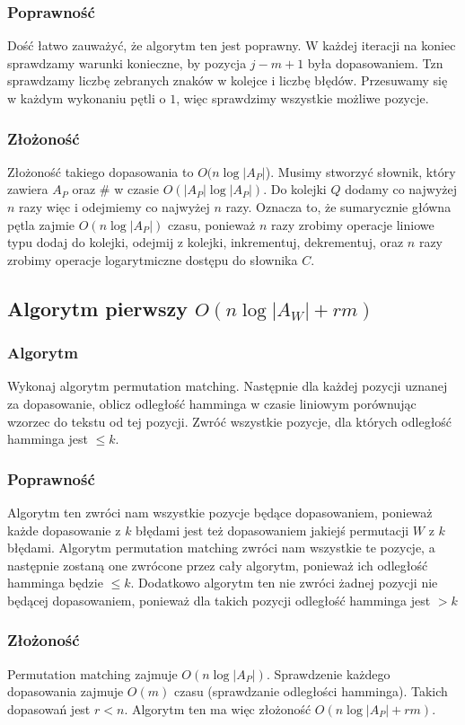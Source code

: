 \documentclass[a4paper,11pt]{article}
\begin{document}
\subsubsection*{Poprawność}
Dość łatwo zauważyć, że algorytm ten jest poprawny. W każdej iteracji na koniec sprawdzamy warunki konieczne, by pozycja $j-m+1$ była dopasowaniem. Tzn sprawdzamy liczbę zebranych znaków w kolejce i liczbę błędów. Przesuwamy się w każdym wykonaniu pętli o $1$, więc sprawdzimy wszystkie możliwe pozycje.
\subsubsection*{Złożoność}
Złożoność takiego dopasowania to $O(n\log |A_P|$). Musimy stworzyć słownik, który zawiera $A_P$ oraz $\#$ w czasie $O(|A_P|\log |A_P|)$. Do kolejki $Q$ dodamy co najwyżej $n$ razy więc i odejmiemy co najwyżej $n$ razy. Oznacza to, że sumarycznie główna pętla zajmie $O(n\log |A_P|)$ czasu, ponieważ $n$ razy zrobimy operacje liniowe typu dodaj do kolejki, odejmij z kolejki, inkrementuj, dekrementuj, oraz $n$ razy zrobimy operacje logarytmiczne dostępu do słownika $C$.

\subsection{Algorytm pierwszy $O(n\log|A_W|+rm)$}
\subsubsection*{Algorytm}
Wykonaj algorytm permutation matching. Następnie dla każdej pozycji uznanej za dopasowanie, oblicz odległość hamminga w czasie liniowym porównując wzorzec do tekstu od tej pozycji. Zwróć wszystkie pozycje, dla których odległość hamminga jest $\leq k$. \subsubsection*{Poprawność}
Algorytm ten zwróci nam wszystkie pozycje będące dopasowaniem, ponieważ każde dopasowanie z $k$ błędami jest też dopasowaniem jakiejś permutacji $W$ z $k$ błędami. Algorytm permutation matching zwróci nam wszystkie te pozycje, a następnie zostaną one zwrócone przez cały algorytm, ponieważ ich odległość hamminga będzie $\leq k$. Dodatkowo algorytm ten nie zwróci żadnej pozycji nie będącej dopasowaniem, ponieważ dla takich pozycji odległość hamminga jest $> k$
\subsubsection*{Złożoność}
Permutation matching zajmuje $O(n\log|A_P|)$. Sprawdzenie każdego dopasowania zajmuje $O(m)$ czasu (sprawdzanie odległości hamminga). Takich dopasowań jest $r < n$. Algorytm ten ma więc złożoność $O(n\log|A_P| +rm)$.
\end{document}
